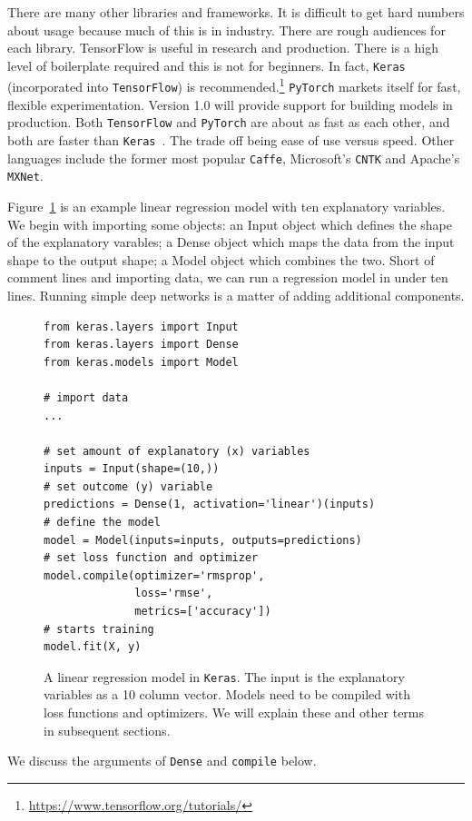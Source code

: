 \documentclass[12pt, a4paper, oneside, headinclude, footinclude]{article}
\begin{document}
There are many other libraries and frameworks. It is difficult to get hard numbers
about usage because much of this is in industry. There are rough
audiences for each library. TensorFlow is useful in research and production.
There is a high level of boilerplate required and this is not for beginners.
In fact, \texttt{Keras} (incorporated into \texttt{TensorFlow}) is
recommended.\footnote{\url{https://www.tensorflow.org/tutorials/}} \texttt{PyTorch} markets
itself for fast, flexible experimentation. Version 1.0 will provide support
for building models in production. Both \texttt{TensorFlow} and
\texttt{PyTorch} are about as fast as each other, and both are faster than
\texttt{Keras}~\cite{Rosinski2017Deep}. The trade off being ease of use versus
speed. Other languages include the former most popular \texttt{Caffe},
Microsoft's \texttt{CNTK} and Apache's \texttt{MXNet}.

Figure~\ref{alg:linreg} is an example linear regression model with ten
explanatory variables.  We begin with importing some objects: an Input object
which defines the shape of the explanatory varables; a Dense object which maps
the data from the input shape to the output shape; a Model object which
combines the two. Short of comment lines and importing data, we can run a
regression model in under ten lines. Running simple deep networks is a matter
of adding additional components.

\begin{figure}
\begin{verbatim}
from keras.layers import Input
from keras.layers import Dense
from keras.models import Model

# import data
...

# set amount of explanatory (x) variables 
inputs = Input(shape=(10,))
# set outcome (y) variable
predictions = Dense(1, activation='linear')(inputs)
# define the model
model = Model(inputs=inputs, outputs=predictions)
# set loss function and optimizer
model.compile(optimizer='rmsprop', 
              loss='rmse', 
              metrics=['accuracy'])
# starts training
model.fit(X, y)  
\end{verbatim}
    \caption[A linear regression model in\texttt{Keras}]{A linear regression model in
   \texttt{Keras}. The input is the explanatory variables as a 10 column vector.
    Models need to be compiled with loss functions and optimizers. We will
    explain these and other terms in subsequent sections.\label{alg:linreg}}
\end{figure}
We discuss the arguments of \texttt{Dense} and \texttt{compile} below. 
\end{document}
